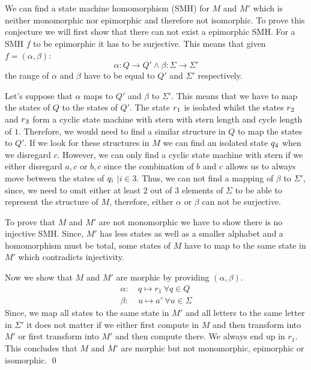 \documentclass[a4paper,12pt,numbers=noenddot]{scrreport}
\begin{document}

\setcounter{chapter}{3}
\chapter{}
\section{}

We can find a state machine homomorphism (SMH) for $M$ and $M'$ which is neither monomorphic nor epimorphic and therefore not isomorphic.
To prove this conjecture we will first show that there can not exist a epimorphic SMH.
For a SMH $f$ to be epimorphic it has to be surjective.
This means that given $f=(\alpha, \beta)$:
\begin{equation}
    \alpha : Q \rightarrow Q' \land \beta : \Sigma \rightarrow \Sigma'
\end{equation}
the range of $\alpha$ and $\beta$ have to be equal to $Q'$ and $\Sigma'$ respectively.

Let's suppose that $\alpha$ maps to $Q'$ and $\beta$ to $\Sigma'$.
This means that we have to map the states of $Q$ to the states of $Q'$.
The state $r\textsubscript{1}$ is isolated whilst the states $r\textsubscript{2}$ and $r\textsubscript{3}$ form a cyclic state machine with stern with stern length and cycle length of $1$.
Therefore, we would need to find a similar structure in $Q$ to map the states to $Q'$.
If we look for these structures in $M$ we can find an isolated state $q\textsubscript{4}$ when we disregard $c$.
However, we can only find a cyclic state machine with stern if we either disregard $a,c$ or $b,c$ since the combination of $b$ and $c$ allows us to always move between the states of $q\textsubscript{i}$ $| i \in {3}$.
Thus, we can not find a mapping of $\beta$ to $\Sigma'$, since, we need to omit either at least $2$ out of $3$ elements of $\Sigma$ to be able to represent the structure of $M$, therefore, either $\alpha$ or $\beta$ can not be surjective.

To prove that $M$ and $M'$ are not monomorphic we have to show there is no injective SMH.
Since, $M'$ has less states as well as a smaller alphabet and a homomorphism must be total, some states of $M$ have to map to the same state in $M'$ which contradicts injectivity.

Now we show that $M$ and $M'$ are morphic by providing $(\alpha, \beta)$.
\begin{align*}
    \alpha:\ &q \mapsto r_1 \ \forall q \in Q \\
    \beta:\ &u \mapsto a'\ \forall u \in \Sigma
\end{align*}
Since, we map all states to the same state in $M'$ and all letters to the same letter in $\Sigma'$ it does not matter if we either first compute in $M$ and then transform into $M'$ or first transform into $M'$ and then compute there.
We always end up in $r_1$.
This concludes that $M$ and $M'$ are morphic but not monomorphic, epimorphic or isomorphic.
\qed
\end{document}
